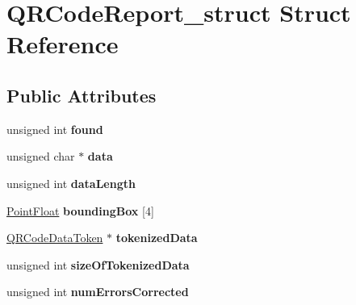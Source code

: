 \hypertarget{structQRCodeReport__struct}{\section{\-Q\-R\-Code\-Report\-\_\-struct \-Struct \-Reference}
\label{structQRCodeReport__struct}
}
\subsection*{\-Public \-Attributes}
\begin{DoxyCompactItemize}
\item 
\hypertarget{structQRCodeReport__struct_ab9ace5e492dac9b2bf9e55b048d62379}{unsigned int {\bfseries found}}\label{structQRCodeReport__struct_ab9ace5e492dac9b2bf9e55b048d62379}

\item 
\hypertarget{structQRCodeReport__struct_a12a32970ffb146f6823a39318cff241e}{unsigned char $\ast$ {\bfseries data}}\label{structQRCodeReport__struct_a12a32970ffb146f6823a39318cff241e}

\item 
\hypertarget{structQRCodeReport__struct_a96132bed6a41917df7d32dd03a103886}{unsigned int {\bfseries data\-Length}}\label{structQRCodeReport__struct_a96132bed6a41917df7d32dd03a103886}

\item 
\hypertarget{structQRCodeReport__struct_a4744c1356ae8754a755b42fccbcf7c8e}{\hyperlink{structPointFloat__struct}{\-Point\-Float} {\bfseries bounding\-Box} \mbox{[}4\mbox{]}}\label{structQRCodeReport__struct_a4744c1356ae8754a755b42fccbcf7c8e}

\item 
\hypertarget{structQRCodeReport__struct_a13ef390c35497f32f62226ebd463ced0}{\hyperlink{structQRCodeDataToken__struct}{\-Q\-R\-Code\-Data\-Token} $\ast$ {\bfseries tokenized\-Data}}\label{structQRCodeReport__struct_a13ef390c35497f32f62226ebd463ced0}

\item 
\hypertarget{structQRCodeReport__struct_ab0cfcb9cbe81d0a0a2a4cc693891d8ef}{unsigned int {\bfseries size\-Of\-Tokenized\-Data}}\label{structQRCodeReport__struct_ab0cfcb9cbe81d0a0a2a4cc693891d8ef}

\item 
\hypertarget{structQRCodeReport__struct_a9fba01d0581a20584c914cbd0973e0bd}{unsigned int {\bfseries num\-Errors\-Corrected}}\label{structQRCodeReport__struct_a9fba01d0581a20584c914cbd0973e0bd}


\end{DoxyCompactItemize}
